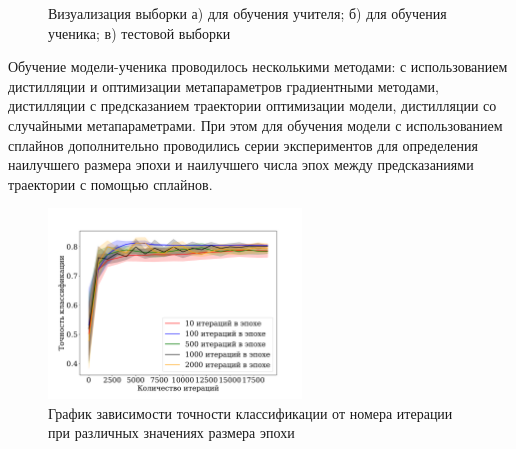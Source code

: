 \documentclass[12pt, twoside]{article}
\begin{document}
\begin{figure}[!ht]
\begin{minipage}[h]{0.5\linewidth}
\end{minipage}
\caption{Визуализация выборки а) для обучения учителя; б) для обучения ученика; в) тестовой выборки}
\label{fig:synt_data}
\end{figure}


Обучение модели-ученика проводилось несколькими методами: с использованием дистилляции и оптимизации метапараметров градиентными методами, дистилляции с предсказанием траектории оптимизации модели, дистилляции со случайными метапараметрами. При этом для обучения модели с использованием сплайнов дополнительно проводились серии экспериментов для определения наилучшего размера эпохи и наилучшего числа эпох между предсказаниями траектории с помощью сплайнов.

\begin{figure}[!ht]
\centering
\includegraphics[width=0.6\textwidth]{linear_epoch_size.pdf}
\caption{График зависимости точности классификации от номера итерации при различных значениях размера эпохи}
\label{fig:epoch_size}
\end{figure}
\end{document}

